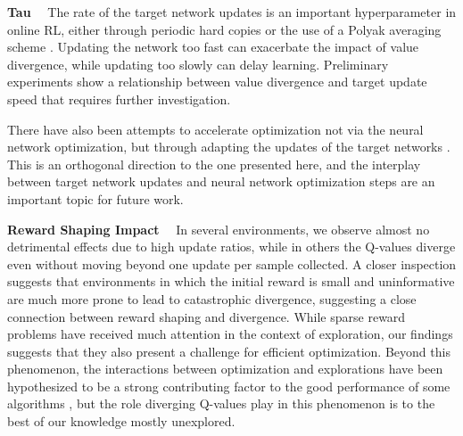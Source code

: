 {\bf Tau}~~ The rate of the target network updates is an important hyperparameter in online RL, either through periodic hard copies \parencite{dqn} or the use of a Polyak averaging scheme \parencite{ddpg}.
Updating the network too fast can exacerbate the impact of value divergence, while updating too slowly can delay learning. Preliminary experiments show a relationship between value divergence and target update speed that requires further investigation.

There have also been attempts to accelerate optimization not via the neural network optimization, but through adapting the updates of the target networks \parencite{vieillard2020momentum,farahmand2021pid}.
This is an orthogonal direction to the one presented here, and the interplay between target network updates and neural network optimization steps are an important topic for future work.


{\bf Reward Shaping Impact}~~ In several environments, we observe almost no detrimental effects due to high update ratios, while in others the Q-values diverge even without moving beyond one update per sample collected.
A closer inspection suggests that environments in which the initial reward is small and uninformative are much more prone to lead to catastrophic divergence, suggesting a close connection between reward shaping and divergence.
While sparse reward problems have received much attention in the context of exploration, our findings suggests that they also present a challenge for efficient optimization.
Beyond this phenomenon, the interactions between optimization and explorations have been hypothesized to be a strong contributing factor to the good performance of some algorithms \parencite{schaul2022phenomenon}, but the role diverging Q-values play in this phenomenon is to the best of our knowledge mostly unexplored.




